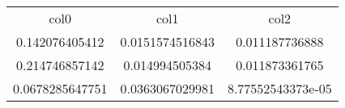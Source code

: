 \begin{table}
\begin{tabular}{ccc}
col0 & col1 & col2 \\
0.142076405412 & 0.0151574516843 & 0.011187736888 \\
0.214746857142 & 0.014994505384 & 0.011873361765 \\
0.0678285647751 & 0.0363067029981 & 8.77552543373e-05 \\
\end{tabular}
\end{table}
